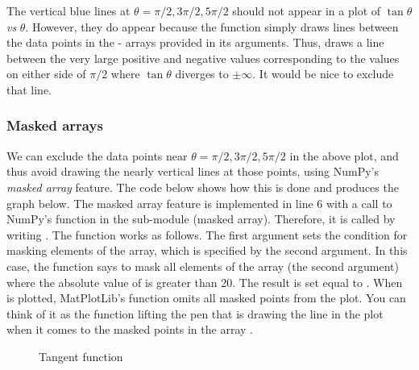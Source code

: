\documentclass[letterpaper,10pt,english]{sphinxmanual}
\begin{document}
The vertical blue lines at $\theta = \pi/2, 3\pi/2, 5\pi/2$ should not appear in a plot of $\tan\theta$ \emph{vs} $\theta$.  However, they do appear because the  function simply draws lines between the data points in the - arrays provided in its arguments.  Thus,  draws a line between the very large positive and negative  values corresponding to the  values on either side of $\pi/2$ where $\tan\theta$ diverges to $\pm\infty$.  It would be nice to exclude that line.


\subsubsection{Masked arrays}
\label{chap5/chap5_plot:masked-arrays}
We can exclude the data points near $\theta = \pi/2, 3\pi/2, 5\pi/2$ in the above plot, and thus avoid drawing the nearly vertical lines at those points, using NumPy's \emph{masked array} feature.  The code below shows how this is done and produces the graph below.  The masked array feature is implemented in line 6 with a call to NumPy's  function in the sub-module  (masked array).  Therefore, it is called by writing .  The  function works as follows.  The first argument sets the condition for masking elements of the array, which is specified by the second argument.  In this case, the function says to mask all elements of the array  (the second argument) where the absolute value of  is greater than 20.  The result is set equal to .  When  is plotted, MatPlotLib's  function omits all masked points from the plot.  You can think of it as the  function lifting the pen that is drawing the line in the plot when it comes to the masked points in the array .
\begin{figure}[htbp]
\centering
\capstart

\caption{Tangent function}\label{chap5/chap5_plot:fig-plotlimits3}\end{figure}
\end{document}
